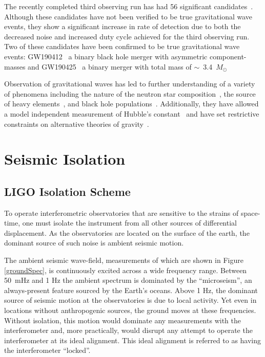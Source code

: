 \documentclass [12pt, proquest]{uwthesis}[2019]
\begin{document}
The recently completed third observing run has had 56 significant candidates~\cite{O3events}. Although these candidates have not been verified to be true gravitational wave events, they show a significant increase in rate of detection due to both the decreased noise and increased duty cycle achieved for the third observing run. Two of these candidates have been confirmed to be true gravitational wave events: GW190412~\cite{GW190412} a binary black hole merger with asymmetric component-masses and GW190425~\cite{GW190425} a binary merger with total mass of $\sim$~3.4~$M_\odot$

Observation of gravitational waves has led to further understanding of a variety of phenomena including the nature of the neutron star composition~\cite{NSEoS}, the source of heavy elements~\cite{heavyElements}, and black hole populations~\cite{GWTC}. Additionally, they have allowed a model independent measurement of Hubble's constant~\cite{hubble1, hubble2} and have set restrictive constraints on alternative theories of gravity~\cite{speedGW}.

\section{Seismic Isolation}\label{seisIso}

\subsection{LIGO Isolation Scheme}

To operate interferometric observatories that are sensitive to the strains of space-time, one must isolate the instrument from all other sources of differential displacement. As the observatories are located on the surface of the earth, the dominant source of such noise is ambient seismic motion. 

The ambient seismic wave-field, measurements of which are shown in Figure \ref{groundSpec}, is continuously excited across a wide frequency range. Between 50~mHz and 1 Hz the ambient spectrum is dominated by the ``microseism'', an always-present feature sourced by the Earth's oceans. Above 1 Hz, the dominant source of seismic motion at the observatories is due to local activity. Yet even in locations without anthropogenic sources, the ground moves at these frequencies. Without isolation, this motion would dominate any measurements with the interferometer and, more practically, would disrupt any attempt to operate the interferometer at its ideal alignment. This ideal alignment is referred to as having the interferometer ``locked''.
\end{document}
